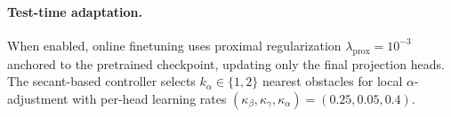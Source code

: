 \documentclass{article} %
\begin{document}
\paragraph{Test-time adaptation.}
When enabled, online finetuning uses proximal regularization $\lambda_{\mathrm{prox}} = 10^{-3}$ anchored to the pretrained checkpoint, updating only the final projection heads. The secant-based controller selects $k_\alpha \in \{1, 2\}$ nearest obstacles for local $\alpha$-adjustment with per-head learning rates $(\kappa_\beta, \kappa_\gamma, \kappa_\alpha) = (0.25, 0.05, 0.4)$.


\end{document}
